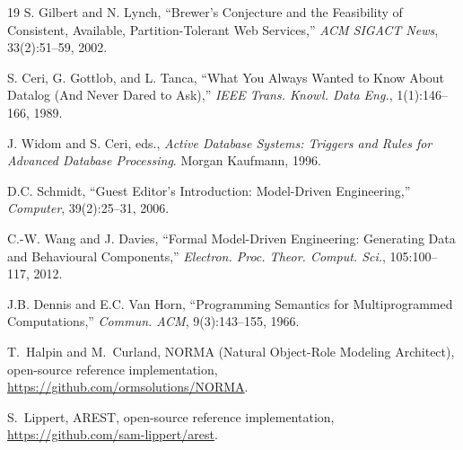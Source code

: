 \documentclass[10pt,twocolumn]{article}
\theoremstyle{plain}
\theoremstyle{definition}
\begin{document}
\begin{thebibliography}{19}
S. Gilbert and N. Lynch, ``Brewer's Conjecture and the Feasibility of Consistent, Available, Partition-Tolerant Web Services,'' \emph{ACM SIGACT News}, 33(2):51--59, 2002.


S. Ceri, G. Gottlob, and L. Tanca, ``What You Always Wanted to Know About Datalog (And Never Dared to Ask),'' \emph{IEEE Trans. Knowl. Data Eng.}, 1(1):146--166, 1989.

J. Widom and S. Ceri, eds., \emph{Active Database Systems: Triggers and Rules for Advanced Database Processing}. Morgan Kaufmann, 1996.

D.C. Schmidt, ``Guest Editor's Introduction: Model-Driven Engineering,'' \emph{Computer}, 39(2):25--31, 2006.

C.-W. Wang and J. Davies, ``Formal Model-Driven Engineering: Generating Data and Behavioural Components,'' \emph{Electron. Proc. Theor. Comput. Sci.}, 105:100--117, 2012.

J.B. Dennis and E.C. Van Horn, ``Programming Semantics for Multiprogrammed Computations,'' \emph{Commun. ACM}, 9(3):143--155, 1966.

T.~Halpin and M.~Curland, NORMA (Natural Object-Role Modeling Architect), open-source reference implementation, \url{https://github.com/ormsolutions/NORMA}.

S.~Lippert, AREST, open-source reference implementation, \url{https://github.com/sam-lippert/arest}.

\end{thebibliography}
\end{document}
